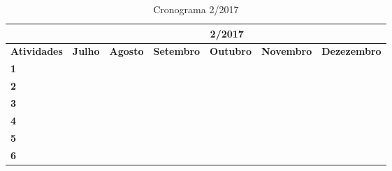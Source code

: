\documentclass[a4paper,12pt]{article}
\begin{document}
\newpage
\begin{table}[H]
\centering
\caption{Cronograma 2/2017}
\label{my-label}
\begin{tabular}{|l|l|l|l|l|l|l|}
\hline
                    & \multicolumn{6}{c|}{\textbf{2/2017}}                                                                                                                                                                                            \\ \hline
\textbf{Atividades} & \textbf{Julho}                                  & \textbf{Agosto}          & \textbf{Setembro}                               & \textbf{Outubro}                                & \textbf{Novembro}        & \textbf{Dezezembro} \\ \hline
\textbf{1}          & \cellcolor[HTML]{000000}                        &                          &                                                 &                                                 &                          &                     \\ \hline
\textbf{2}          & \cellcolor[HTML]{000000}{\color[HTML]{333333} } & \cellcolor[HTML]{000000} &                                                \cellcolor[HTML]{000000} &                                                 &                          &                     \\ \hline
\textbf{3}          &                                                 &  & \cellcolor[HTML]{000000}                        &                                                 &                          &                     \\ \hline
\textbf{4}          &                                                 &                          & \cellcolor[HTML]{000000}{\color[HTML]{000000} } & \cellcolor[HTML]{000000}{\color[HTML]{000000} } &                          &                     \\ \hline
\textbf{5}          &                                                 &                          &                         & \cellcolor[HTML]{000000}{\color[HTML]{000000} } &                          &                     \\ \hline
\textbf{6}          &                                                 &                          &                                                 &                         &       \cellcolor[HTML]{000000}                   &                     \\ \hline

\end{tabular}
\end{table}
		
\end{document}
